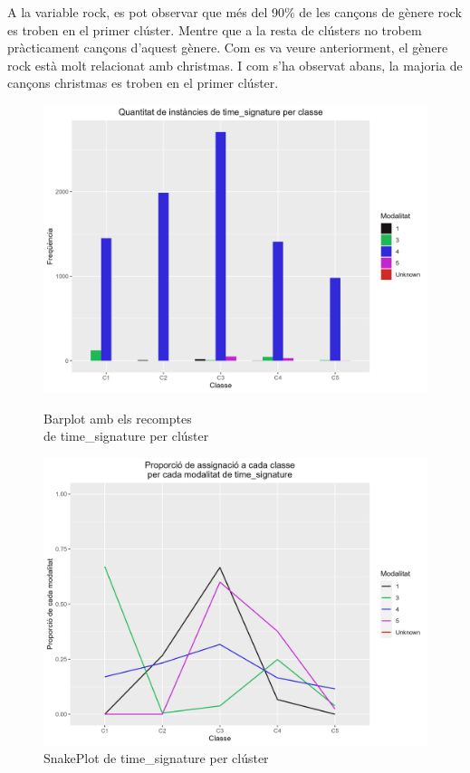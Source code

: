 A la variable rock, es pot observar que més del 90\% de les cançons de gènere rock es troben en el primer clúster. Mentre que a la resta de clústers no trobem pràcticament cançons d'aquest gènere. Com es va veure anteriorment, el gènere rock està molt relacionat amb christmas. I com s'ha observat abans, la majoria de cançons christmas es troben en el primer clúster.

\begin{figure}[H]
\centering
    \begin{minipage}{.49\textwidth}
        \centering
        \includegraphics[width=0.95\linewidth]{Images/5_Profiling/categoriques/cat/Cat_BarPlot_time_signature.png}
        \caption{Barplot amb els recomptes \\ de time\_signature per clúster}
        \label{fig:Cat_BarPlot_time_signature}
    \end{minipage}%
    \begin{minipage}{.49\textwidth}
        \centering
        \includegraphics[width=0.95\linewidth]{Images/5_Profiling/categoriques/cat/Cat_SnakePlot_time_signature.png}
        \caption{SnakePlot de time\_signature per clúster}
        \label{fig:Cat_SnakePlot_time_signature}
    \end{minipage}%
\end{figure}

